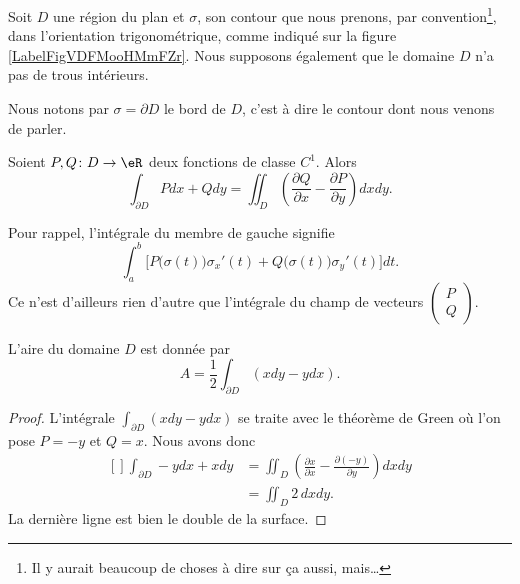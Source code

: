 Soit $D$ une région du plan et $\sigma$, son contour que nous prenons, par convention\footnote{Il y aurait beaucoup de choses à dire sur ça aussi, mais\ldots}, dans l'orientation trigonométrique, comme indiqué sur la figure \ref{LabelFigVDFMooHMmFZr}. Nous supposons également que le domaine $D$ n'a pas de trous intérieurs.
\newcommand{\CaptionFigVDFMooHMmFZr}{Un contour avec son ortientation.}


Nous notons par $\sigma=\partial D$ le bord de $D$, c'est à dire le contour dont nous venons de parler.

\begin{theorem}
    Soient $P,Q\colon D\to \eR$ deux fonctions de classe $C^1$. Alors
    \begin{equation}        \label{EqThoGreen}
        \int_{\partial D} Pdx+Qdy=\iint_D\left( \frac{ \partial Q }{ \partial x }-\frac{ \partial P }{ \partial y } \right)dxdy.
    \end{equation}
\end{theorem}
Pour rappel, l'intégrale du membre de gauche signifie
\begin{equation}
    \int_a^b \Big[P\big( \sigma(t) \big)\sigma_x'(t)+Q\big( \sigma(t) \big)\sigma_y'(t)\Big]dt.
\end{equation}
Ce n'est d'ailleurs rien d'autre que l'intégrale du champ de vecteurs $\begin{pmatrix}
    P    \\ 
    Q    
\end{pmatrix}$.

\begin{corollary}
    L'aire du domaine $D$ est donnée par
    \begin{equation}
        A=\frac{ 1 }{2}\int_{\partial D}(xdy-ydx).
    \end{equation}
\end{corollary}

\begin{proof}
    L'intégrale $\int_{\partial D}(xdy-ydx)$ se traite avec le théorème de Green où l'on pose $P=-y$ et $Q=x$. Nous avons donc
    \begin{equation}
        \begin{aligned}[]
            \int_{\partial D} -ydx+xdy&=\iint_D\left( \frac{ \partial x }{ \partial x }-\frac{ \partial (-y) }{ \partial y } \right)dxdy\\
            &=\iint_D2\,dxdy.
        \end{aligned}
    \end{equation}
    La dernière ligne est bien le double de la surface.
\end{proof}


